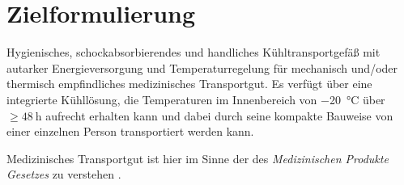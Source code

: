 \chapter{Zielformulierung}
	Hygienisches, schockabsorbierendes und handliches Kühltransportgefäß mit autarker Energieversorgung und Temperaturregelung für mechanisch und/oder thermisch
	empfindliches medizinisches Transportgut. Es verfügt über eine integrierte Kühllösung, die Temperaturen im Innenbereich von \SI{-20}{\celsius} über
	\(\geq \SI{48}{\hour}\) aufrecht erhalten kann und dabei durch seine kompakte Bauweise von einer einzelnen Person transportiert werden kann.\par\medskip
	Medizinisches Transportgut ist hier im Sinne der des \textit{Medizinischen Produkte Gesetzes} zu verstehen \cite{MPG}.